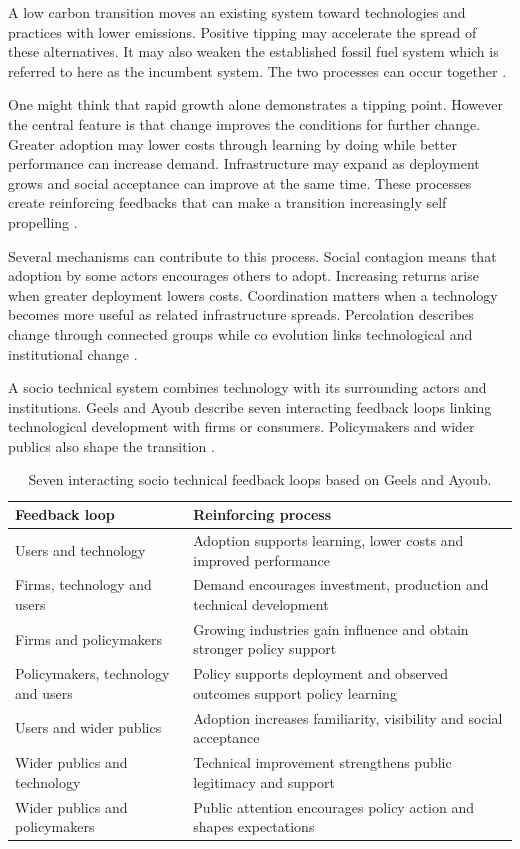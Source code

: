 \documentclass[
]{krantz}
\begin{document}
A low carbon transition moves an existing system toward technologies and practices with lower emissions. Positive tipping may accelerate the spread of these alternatives. It may also weaken the established fossil fuel system which is referred to here as the incumbent system. The two processes can occur together \citep{lenton2026}.

One might think that rapid growth alone demonstrates a tipping point. However the central feature is that change improves the conditions for further change. Greater adoption may lower costs through learning by doing while better performance can increase demand. Infrastructure may expand as deployment grows and social acceptance can improve at the same time. These processes create reinforcing feedbacks that can make a transition increasingly self propelling \citep{lenton2026}.

Several mechanisms can contribute to this process. Social contagion means that adoption by some actors encourages others to adopt. Increasing returns arise when greater deployment lowers costs. Coordination matters when a technology becomes more useful as related infrastructure spreads. Percolation describes change through connected groups while co evolution links technological and institutional change \citep{lenton2026}.

A socio technical system combines technology with its surrounding actors and institutions. Geels and Ayoub describe seven interacting feedback loops linking technological development with firms or consumers. Policymakers and wider publics also shape the transition \citep{geels2023}.

\begin{table}

\caption{\label{tab:ptp-feedbackloops}Seven interacting socio technical feedback loops based on Geels and Ayoub.}
\centering
\begin{tabular}[t]{l|l}
\hline
Feedback loop & Reinforcing process\\
\hline
Users and technology & Adoption supports learning, lower costs and improved performance\\
\hline
Firms, technology and users & Demand encourages investment, production and technical development\\
\hline
Firms and policymakers & Growing industries gain influence and obtain stronger policy support\\
\hline
Policymakers, technology and users & Policy supports deployment and observed outcomes support policy learning\\
\hline
Users and wider publics & Adoption increases familiarity, visibility and social acceptance\\
\hline
Wider publics and technology & Technical improvement strengthens public legitimacy and support\\
\hline
Wider publics and policymakers & Public attention encourages policy action and shapes expectations\\
\hline
\end{tabular}
\end{table}
\end{document}
